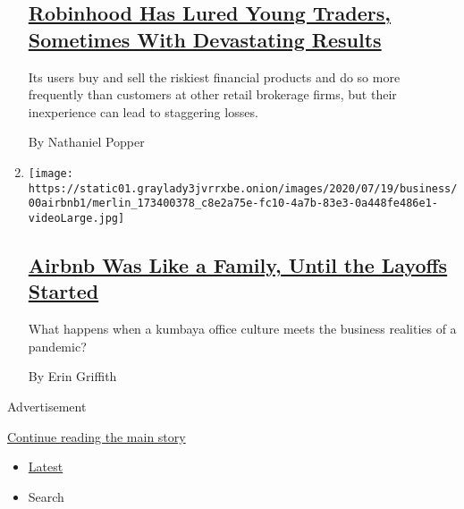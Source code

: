 \begin{enumerate}
  \hypertarget{robinhood-has-lured-young-traders-sometimes-with-devastating-results}{%
  \subsection{\texorpdfstring{\href{/2020/07/08/technology/robinhood-risky-trading.html}{Robinhood
  Has Lured Young Traders, Sometimes With Devastating
  Results}}{Robinhood Has Lured Young Traders, Sometimes With Devastating Results}}\label{robinhood-has-lured-young-traders-sometimes-with-devastating-results}}

  Its users buy and sell the riskiest financial products and do so more
  frequently than customers at other retail brokerage firms, but their
  inexperience can lead to staggering losses.

  By Nathaniel Popper
\item
  \texttt{[image: https://static01.graylady3jvrrxbe.onion/images/2020/07/19/business/00airbnb1/merlin\_173400378\_c8e2a75e-fc10-4a7b-83e3-0a448fe486e1-videoLarge.jpg]}

  \hypertarget{airbnb-was-like-a-family-until-the-layoffs-started}{%
  \subsection{\texorpdfstring{\href{/2020/07/17/technology/airbnb-coronavirus-layoffs-.html}{Airbnb
  Was Like a Family, Until the Layoffs
  Started}}{Airbnb Was Like a Family, Until the Layoffs Started}}\label{airbnb-was-like-a-family-until-the-layoffs-started}}

  What happens when a kumbaya office culture meets the business
  realities of a pandemic?

  By Erin Griffith
\end{enumerate}

Advertisement

\protect\hyperlink{after-mid1}{Continue reading the main story}

\begin{itemize}
\tightlist
\item
  \protect\hyperlink{stream-panel}{Latest}
\item
  Search
\end{itemize}

